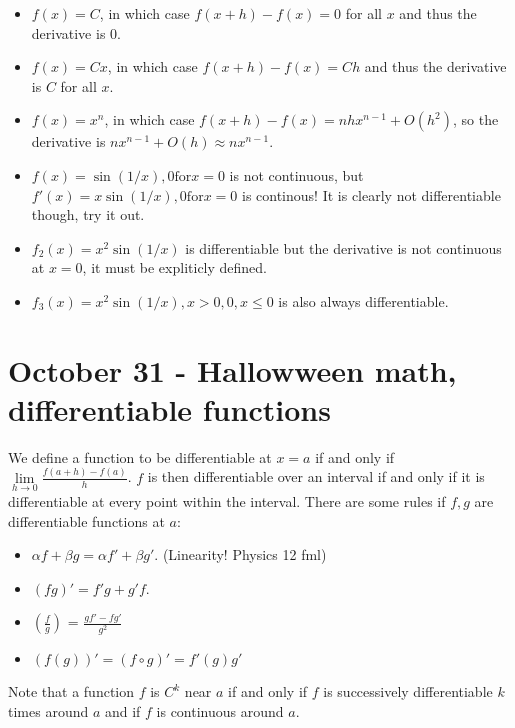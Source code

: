 \documentclass{report}
\begin{document}
\begin{itemize}
\item $f(x) = C$, in which case $f(x + h) - f(x) = 0$ for all $x$ and thus the derivative is $0$. 
\item $f(x) = Cx$, in which case $f(x + h) - f(x) = Ch$ and thus the derivative is $C$ for all $x$. 
\item $f(x) = x^n$, in which case $f(x + h) - f(x) = nhx^{n-1} + O(h^2)$, so the derivative is $nx^{n-1} + O(h) \approx nx^{n-1}$. 
\item $f(x) = \sin(1/x), 0 \mathrm{for} x=0$ is not continuous, but $f'(x) = x\sin(1/x), 0 \mathrm{for} x=0$ is continous! It is clearly not differentiable though, try it out.
\item $f_2(x) = x^2\sin(1/x)$ is differentiable but the derivative is not continuous at $x=0$, it must be expliticly defined. 
\item $f_3(x) = x^2\sin(1/x), x > 0, 0, x \leq 0$ is also always differentiable.
\end{itemize}

\chapter{October 31 - Hallowween math, differentiable functions}

We define a function to be differentiable at $x = a$ if and only if $\displaystyle\lim\limits_{h \to 0} {\frac{f(a+h) - f(a)}{h}}$. $f$ is then differentiable over an interval if and only if it is differentiable at every point within the interval. There are some rules if $f,g$ are differentiable functions at $a$:

\begin{itemize}
\item $\alpha f + \beta g = \alpha f' + \beta g'$. (Linearity! Physics 12 fml)
\item $(fg)' = f'g + g'f$.
\item $(\frac{f}{g})$ = $\frac{gf' - fg'}{g^2}$
\item $(f(g))' = (f \circ g)' = f'(g)g'$
\end{itemize}

Note that a function $f$ is $C^k$ near $a$ if and only if $f$ is successively differentiable $k$ times around $a$ and if $f$ is continuous around $a$.
\end{document}
